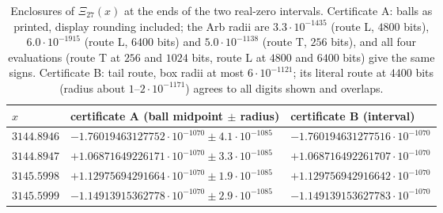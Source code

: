 \documentclass[11pt]{article}
\theoremstyle{plain}
\theoremstyle{definition}
\theoremstyle{remark}
\begin{document}
\begin{table}[ht]
\centering\small
\begin{tabular}{lll}
\toprule
$x$ & certificate A (ball midpoint $\pm$ radius) & certificate B (interval) \\
\midrule
$3144.8946$ & $-1.76019463127752\cdot10^{-1070} \pm 4.1\cdot10^{-1085}$ &
$-1.760194631277516\cdot10^{-1070}$ \\
$3144.8947$ & $+1.06871649226171\cdot10^{-1070} \pm 3.3\cdot10^{-1085}$ &
$+1.068716492261707\cdot10^{-1070}$ \\
$3145.5998$ & $+1.12975694291664\cdot10^{-1070} \pm 1.9\cdot10^{-1085}$ &
$+1.129756942916642\cdot10^{-1070}$ \\
$3145.5999$ & $-1.14913915362778\cdot10^{-1070} \pm 2.9\cdot10^{-1085}$ &
$-1.149139153627783\cdot10^{-1070}$ \\
\bottomrule
\end{tabular}
\caption{Enclosures of $\Xi_{27}(x)$ at the ends of the two real-zero intervals.
Certificate A: balls as printed, display rounding included; the Arb radii are
$3.3\cdot10^{-1435}$ (route L, $4800$ bits), $6.0\cdot10^{-1915}$ (route L,
$6400$ bits) and $5.0\cdot10^{-1138}$ (route T, $256$ bits), and all four
evaluations (route T at $256$ and $1024$ bits, route L at $4800$ and $6400$ bits)
give the same signs. Certificate B: tail route, box radii at most
$6\cdot10^{-1121}$; its literal route at $4400$ bits (radius about
$1$--$2\cdot10^{-1171}$) agrees to all digits shown and overlaps.}
\label{tab:real}
\end{table}
\end{document}
